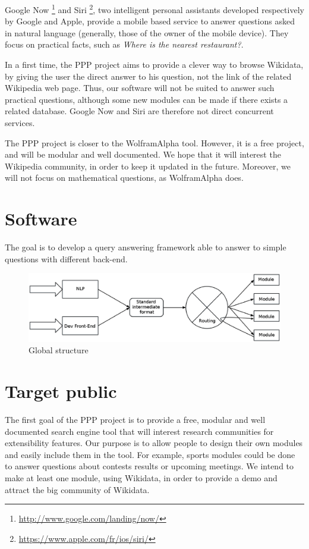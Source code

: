 \documentclass[a4paper,10pt]{article}
\begin{document}
Google Now \footnote{\url{http://www.google.com/landing/now/}} and Siri
\footnote{\url{https://www.apple.com/fr/ios/siri/}}, two intelligent personal assistants
developed respectively by Google and Apple, provide a mobile based service to 
answer questions asked in natural language (generally, those of the owner of the
mobile device). They focus on practical facts, such as \emph{Where is the nearest
restaurant?}.

In a first time, the PPP project aims to provide a clever way to browse Wikidata, by giving the 
user the direct answer to his question, not the link of the related Wikipedia
web page. Thus, our software will not be suited to answer such practical questions,
although some new modules can be made if there exists a related database. Google Now
and Siri are therefore not direct concurrent services.

The PPP project is closer to the WolframAlpha tool. However, it is a free project,
and will be modular and well documented. We hope that it will interest the 
Wikipedia community, in order to keep it updated in the future. Moreover,
we will not focus on mathematical questions, as WolframAlpha does.


\section{Software}

The goal is to develop a query answering framework able to answer to simple questions with different back-end. 

\begin{figure}[!h]
    \centering
    \includegraphics[scale=0.39]{images/Structure-PPP-en.eps}
    \caption{Global structure}
\end{figure}

\section{Target public}

The first goal of the PPP project is to provide a free, modular and well documented search engine tool that will 
interest research communities for extensibility features. Our purpose is to allow people to design their own modules and
easily include them in the tool. For example, sports modules could be done to answer questions about contests results or 
upcoming meetings. We intend to make at least one module, using Wikidata, in order to provide a demo and attract the big 
community of Wikidata. 
\end{document}
